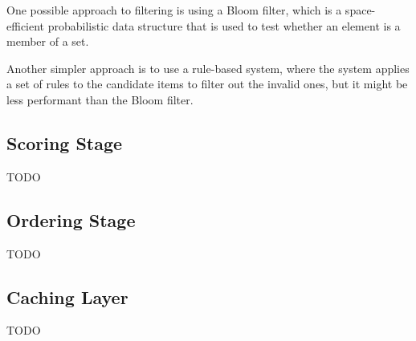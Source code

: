 One possible approach to filtering is using a Bloom filter, which is a space-efficient probabilistic data structure that is used to test whether an element is a member of a set.

Another simpler approach is to use a rule-based system, where the system applies a set of rules to the candidate items to filter out the invalid ones, but it might be less performant than the Bloom filter.


\subsection{Scoring Stage}

TODO

\subsection{Ordering Stage}

TODO

\subsection{Caching Layer}

TODO
